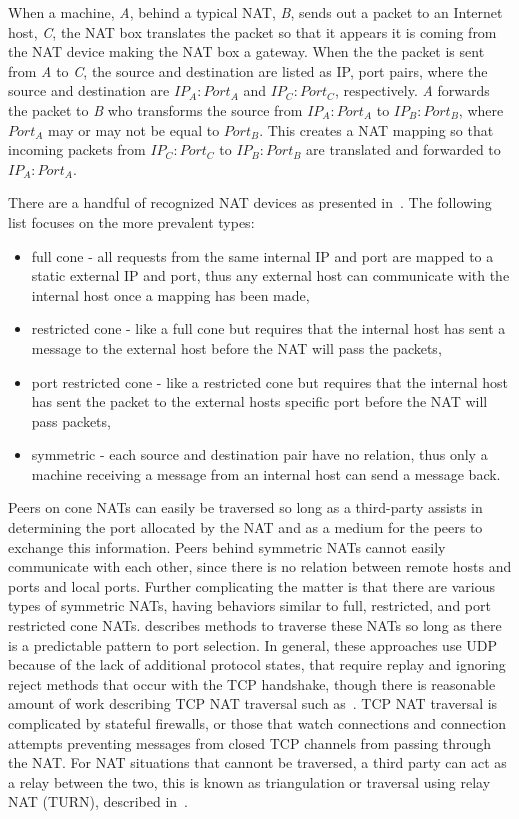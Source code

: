 When a machine, \textit{A}, behind a typical NAT, \textit{B}, sends out a
packet to an Internet host, \textit{C}, the NAT box translates the packet so
that it appears it is coming from the NAT device making the NAT box a gateway.
When the the packet is sent from \textit{A} to \textit{C}, the source and
destination are listed as IP, port pairs, where the source and destination are
$IP_A:Port_A$ and $IP_C:Port_C$, respectively.  \textit{A} forwards the packet
to \textit{B} who transforms the source from $IP_A:Port_A$ to $IP_B:Port_B$,
where $Port_A$ may or may not be equal to $Port_B$.  This creates a NAT mapping
so that incoming packets from $IP_C:Port_C$ to $IP_B:Port_B$ are translated and
forwarded to $IP_A:Port_A$.

There are a handful of recognized NAT devices as presented in~\cite{stun,
p2p_nats_rfc}.  The following list focuses on the more prevalent types:
\begin{itemize}
\item full cone - all requests from the same internal IP and port are mapped to
a static external IP and port, thus any external host can communicate with the
internal host once a mapping has been made,
\item restricted cone - like a full cone but requires that the internal host
has sent a message to the external host before the NAT will pass the packets,
\item port restricted cone - like a restricted cone but requires that the
internal host has sent the packet to the external hosts specific port before the
NAT will pass packets,
\item symmetric - each source and destination pair have no relation, thus only
a machine receiving a message from an internal host can send a message back.
\end{itemize}

Peers on cone NATs can easily be traversed so long as a third-party assists in
determining the port allocated by the NAT and as a medium for the peers to
exchange this information.  Peers behind symmetric NATs cannot easily
communicate with each other, since there is no relation between remote hosts
and ports and local ports.  Further complicating the matter is that there are
various types of symmetric NATs, having behaviors similar to full, restricted,
and port restricted cone NATs.  \cite{nat_stun} describes methods to traverse
these NATs so long as there is a predictable pattern to port selection.  In
general, these approaches use UDP because of the lack of additional protocol
states, that require replay and ignoring reject methods that occur with the TCP
handshake,  though there is reasonable amount of work describing TCP NAT
traversal such as~\cite{tcp_nat}.  TCP NAT traversal is complicated by stateful
firewalls, or those that watch connections and connection attempts preventing
messages from closed TCP channels from passing through the NAT.  For NAT
situations that cannont be traversed, a third party can act as a relay between
the two, this is known as triangulation or traversal using relay NAT (TURN),
described in~\cite{turn}.

